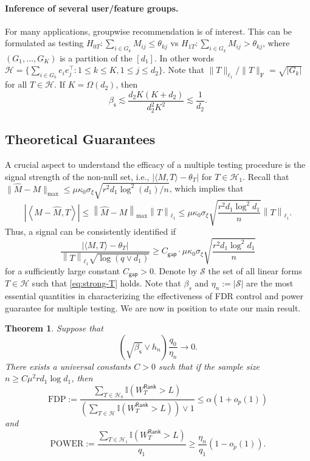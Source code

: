 \documentclass[12pt]{article}
\newcommand{\abs}[1]{\left\lvert#1\right\rvert}
\newcommand{\norm}[1]{\left\lVert#1\right\rVert}
\newcommand{\cH}{\mathcal{H}}
\newcommand{\cS}{\mathcal{S}}
\newcommand{\bbI}{\mathbb{I}}
\newtheorem{Theorem}{Theorem}
\theoremstyle{plain}
\begin{document}
\begin{sloppypar}
	
\paragraph{Inference of several user/feature groups.} For many applications, groupwise recommendation \citep{bi2018multilayer} is of interest. This can be formulated as testing $H_{0T}: \sum_{i\in G_k} M_{ij}\le \theta_{kj}$ vs $H_{1T}: \sum_{i\in G_k} M_{ij}>\theta_{kj} $, where $(G_1,\ldots,G_K)$ is a partition of the $[d_1]$. In other words $\cH=\{\sum_{i\in G_k}e_ie_j^\top: 1\le k\le K, 1\le j\le d_2\}$.
Note that $\|T\|_{\ell_1} /\|T\|_{\mathrm{F}}=\sqrt{\abs{G_k} }$ for all $T\in \cH$. If $K=\Omega(d_2)$, then 
$$\beta_{\mathsf{s} }\lesssim \frac{d_2K(K+d_2)}{d_2^2K^2}\lesssim\frac{1}{d_2}.$$

\subsection{Theoretical Guarantees}
A crucial aspect to understand the efficacy of a multiple testing procedure is the signal strength of the non-null set, i.e., $|\langle M, T\rangle-\theta_T|$ for $T\in\cH_1$. Recall that $\|\widehat{M}-M\|_{\max}\le\mu \kappa_0 \sigma_{\xi}\sqrt{r^2 d_1 \log ^2 (d_1)/n}$, which implies that
\begin{equation*}
\abs{\left\langle M-\widehat M ,T  \right\rangle} \le \norm{\widehat{M}-M}_{\max} \norm{T}_{\ell_1}\le  \mu \kappa_0 \sigma_{\xi}\sqrt{\frac{r^2 d_1 \log ^2 d_1}{n}} \norm{T}_{\ell_1}.
\end{equation*}
Thus, a signal can be consistently identified if
\begin{equation}\label{eq:strong-T}
\frac{ \abs{\langle M, T\rangle-\theta_T } }{  \norm{T}_{\ell_1} \sqrt{ \log (q \vee d_1) } } \ge C_{\mathsf{gap}  } \cdot \mu \kappa_0 \sigma_{\xi}\sqrt{\frac{r^2 d_1 \log ^2 d_1}{n}}
\end{equation}
for a sufficiently large constant $C_{\mathsf{gap}}>0$. Denote by $\cS$ the set of all linear forms $T\in \cH$ such that \eqref{eq:strong-T} holds. Note that $\beta_s$ and $\eta_n:=|\cS|$ are the most essential quantities in characterizing the effectiveness of FDR control and power guarantee for multiple testing. We are now in position to state our main result.

\begin{Theorem}\label{thm:weak-cor-fdr}
Suppose that
$$
\left(\sqrt{\beta_{\mathsf{s}}} \vee  h_n \right)  \frac{q_0}{\eta_n}   \to 0. 
$$
There exists a universal constants $C>0$ such that if the sample size $n\ge C \mu^2 r d_1 \log d_1$, then
$$
\mathrm{FDP}:=\frac{\sum_{T\in \cH_0  } \bbI(W_T^{\mathsf{Rank}} >L ) }{\left( \sum_{T\in \cH  } \bbI(W_T^{\mathsf{Rank}} >L ) \right) \vee 1 }\le \alpha(1+o_p(1))
$$
and
$$
\mathrm{POWER}:= \frac{\sum_{T\in \cH_1  } \bbI(W_T^{\mathsf{Rank}} >L ) }{q_1} \ge \frac{\eta_n}{q_1}(1-o_p(1)).
$$
\end{Theorem}


\end{sloppypar}
\end{document}
